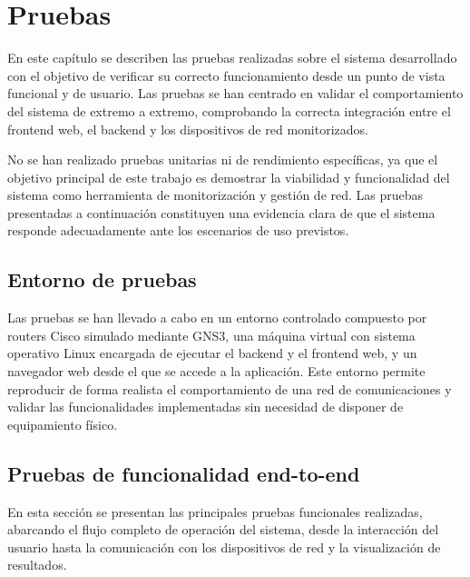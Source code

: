
\chapter{Pruebas}

En este capítulo se describen las pruebas realizadas sobre el sistema desarrollado con el objetivo de verificar su correcto funcionamiento desde un punto de vista funcional y de usuario. Las pruebas se han centrado en validar el comportamiento del sistema de extremo a extremo, comprobando la correcta integración entre el frontend web, el backend y los dispositivos de red monitorizados.

No se han realizado pruebas unitarias ni de rendimiento específicas, ya que el objetivo principal de este trabajo es demostrar la viabilidad y funcionalidad del sistema como herramienta de monitorización y gestión de red. Las pruebas presentadas a continuación constituyen una evidencia clara de que el sistema responde adecuadamente ante los escenarios de uso previstos.

\section{Entorno de pruebas}

Las pruebas se han llevado a cabo en un entorno controlado compuesto por routers Cisco simulado mediante GNS3, una máquina virtual con sistema operativo Linux encargada de ejecutar el backend y el frontend web, y un navegador web desde el que se accede a la aplicación. Este entorno permite reproducir de forma realista el comportamiento de una red de comunicaciones y validar las funcionalidades implementadas sin necesidad de disponer de equipamiento físico.

\section{Pruebas de funcionalidad end-to-end}

En esta sección se presentan las principales pruebas funcionales realizadas, abarcando el flujo completo de operación del sistema, desde la interacción del usuario hasta la comunicación con los dispositivos de red y la visualización de resultados.


